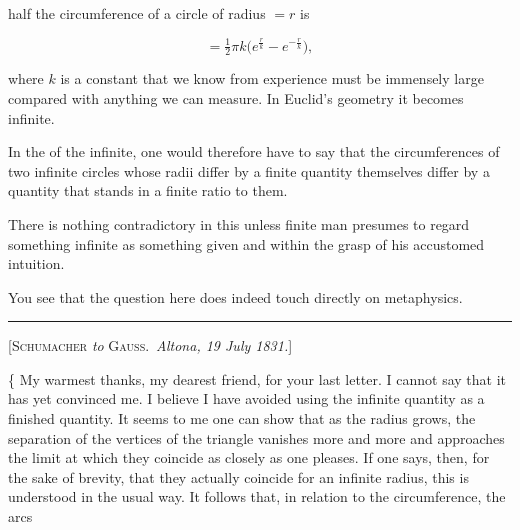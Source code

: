 %
half the circumference of a circle of radius $=r$ is

\[
=\tfrac{1}{2}\pi k\bigl(e^{\frac{r}{k}}-e^{-\frac{r}{k}}\bigr),
\]

\noindent where $k$ is a constant that we know from experience must be immensely large compared with anything we can measure. In Euclid's geometry it becomes infinite.

In the  of the infinite, one would therefore have to say that the circumferences of two infinite circles whose radii differ by a finite quantity themselves differ by a quantity that stands in a finite ratio to them.

There is nothing contradictory in this unless finite man presumes to regard something infinite as something given and within the grasp of his accustomed intuition.

You see that the question here does indeed touch directly on metaphysics.

\bigskip
\rule{4cm}{0.4pt}
\bigskip

\begin{center}
[\textsc{Schumacher} \emph{to} \textsc{Gauss}.\ \emph{Altona, 19 July 1831.}]
\end{center}

\smallskip
\{ My warmest thanks, my dearest friend, for your last letter. I cannot say that it has yet convinced me. I believe I have avoided using the infinite quantity as a finished quantity. It seems to me one can show that as the radius grows, the separation of the vertices of the triangle vanishes more and more and approaches the limit at which they coincide as closely as one pleases. If one says, then, for the sake of brevity, that they actually coincide for an infinite radius, this is understood in the usual way. It follows that, in relation to the circumference, the arcs

